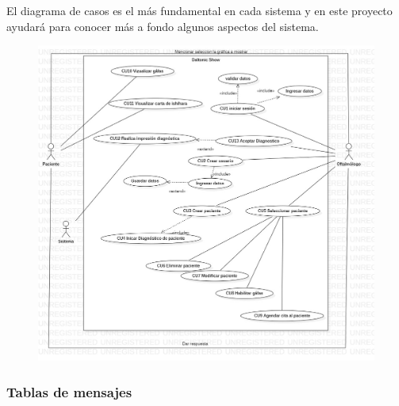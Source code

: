 \documentclass[10pt]{article}
\begin{document}
El diagrama de casos es el más fundamental en cada sistema y en este proyecto ayudará para conocer más a fondo algunos aspectos del sistema.

\begin{figure}[H]
	\begin{center}
\includegraphics[scale = 0.40]{UML/UseCaseDiagram1.jpg}
	\end{center} 
\end{figure}

\newpage


\subsubsection{Tablas de mensajes}
\end{document}
